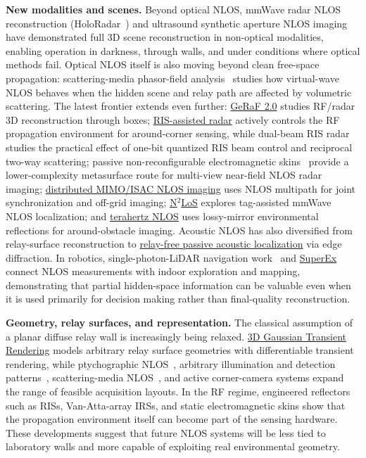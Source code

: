 \textbf{New modalities and scenes.}
Beyond optical NLOS, mmWave radar NLOS reconstruction (HoloRadar~\cite{laiHoloRadar2025}) and ultrasound synthetic aperture NLOS imaging~\cite{ultrasoundNLOS2025} have demonstrated full 3D scene reconstruction in non-optical modalities, enabling operation in darkness, through walls, and under conditions where optical methods fail. Optical NLOS itself is also moving beyond clean free-space propagation: scattering-media phasor-field analysis~\cite{luesiaScatteringPhasor2023} studies how virtual-wave NLOS behaves when the hidden scene and relay path are affected by volumetric scattering. The latest frontier extends even further: \href{https://arxiv.org/abs/2605.29098}{GeRaF 2.0} studies RF/radar 3D reconstruction through boxes; \href{https://arxiv.org/abs/2602.11471}{RIS-assisted radar} actively controls the RF propagation environment for around-corner sensing, while dual-beam RIS radar~\cite{yasmeenDualBeamRIS2026} studies the practical effect of one-bit quantized RIS beam control and reciprocal two-way scattering; passive non-reconfigurable electromagnetic skins~\cite{tornielliEMSkinsNLOS2024} provide a lower-complexity metasurface route for multi-view near-field NLOS radar imaging; \href{https://arxiv.org/abs/2603.13981}{distributed MIMO/ISAC NLOS imaging} uses NLOS multipath for joint synchronization and off-grid imaging; \href{https://arxiv.org/abs/2505.08240}{N$^2$LoS} explores tag-assisted mmWave NLOS localization; and \href{https://arxiv.org/abs/2205.05066}{terahertz NLOS} uses lossy-mirror environmental reflections for around-obstacle imaging. Acoustic NLOS has also diversified from relay-surface reconstruction to \href{https://arxiv.org/abs/2506.08471}{relay-free passive acoustic localization} via edge diffraction. In robotics, single-photon-LiDAR navigation work~\cite{youngNavigationNLOS2024} and \href{https://arxiv.org/abs/2510.10506}{SuperEx} connect NLOS measurements with indoor exploration and mapping, demonstrating that partial hidden-space information can be valuable even when it is used primarily for decision making rather than final-quality reconstruction.

\textbf{Geometry, relay surfaces, and representation.}
The classical assumption of a planar diffuse relay wall is increasingly being relaxed. \href{https://arxiv.org/abs/2606.21270}{3D Gaussian Transient Rendering} models arbitrary relay surface geometries with differentiable transient rendering, while ptychographic NLOS~\cite{songPtychographicNLOS2024}, arbitrary illumination and detection patterns~\cite{liuArbitraryPatternNLOS2023}, scattering-media NLOS~\cite{luesiaScatteringPhasor2023}, and active corner-camera systems expand the range of feasible acquisition layouts. In the RF regime, engineered reflectors such as RISs, Van-Atta-array IRSs, and static electromagnetic skins show that the propagation environment itself can become part of the sensing hardware. These developments suggest that future NLOS systems will be less tied to laboratory walls and more capable of exploiting real environmental geometry.

